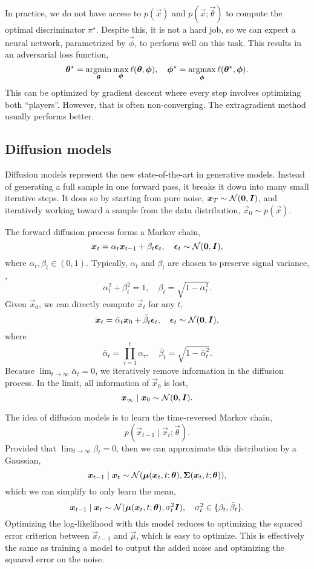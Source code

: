 In practice, we do not have access to $p(\vec{x})$ and $p(\vec{x}; \vec{\theta})$ to compute the
optimal discriminator $\pi^\star$. Despite this, it is not a hard job, so we can expect a neural
network, parametrized by $\vec{\phi}$, to perform well on this task. This results in an adversarial
loss function, \[
    \bm{\theta}^\star = \operatorname*{argmin}_{\bm{\theta}} \max_{\bm{\phi}} \ell(\bm{\theta}, \bm{\phi}), \quad \bm{\phi}^\star = \operatorname*{argmax}_{\bm{\phi}} \ell(\bm{\theta}^\star, \bm{\phi}).
\]
This can be optimized by gradient descent where every step involves optimizing both ``players''.
However, that is often non-converging. The extragradient method usually performs better.

\subsection{Diffusion models}

Diffusion models represent the new state-of-the-art in generative models. Instead of generating a
full sample in one forward pass, it breaks it down into many small iterative steps. It does so by
starting from pure noise, $\bm{x}_T \sim \mathcal{N}(\bm{0}, \bm{I})$, and iteratively working
toward a sample from the data distribution, $\vec{x}_0 \sim p(\vec{x})$.

The forward diffusion process forms a Markov chain, \[
    \bm{x}_t = \alpha_t \bm{x}_{t-1} + \beta_t \bm{\epsilon}_t, \quad \bm{\epsilon}_t \sim \mathcal{N}(\bm{0}, \bm{I}),
\]
where $\alpha_t, \beta_t \in (0,1)$. Typically, $\alpha_t$ and $\beta_t$ are chosen to preserve
signal variance, \ie, \[
    \alpha_t^2 + \beta_t^2 = 1, \quad \beta_t = \sqrt{1 - \alpha_t^2}.
\]
Given $\vec{x}_0$, we can directly compute $\vec{x}_t$ for any $t$, \[
    \bm{x}_t = \bar{\alpha}_t \bm{x}_0 + \bar{\beta}_t \bm{\epsilon}_t, \quad \bm{\epsilon}_t \sim \mathcal{N}(\bm{0}, \bm{I}),
\]
where \[
    \bar{\alpha}_t = \prod_{\tau=1}^{t} \alpha_\tau, \quad \bar{\beta}_t = \sqrt{1 - \bar{\alpha}_t^2}.
\]
Because $\lim_{t \to \infty} \bar{\alpha}_t = 0$, we iteratively remove information in the
diffusion process. In the limit, all information of $\vec{x}_0$ is lost, \[
    \bm{x}_{\infty} \mid \bm{x}_0 \sim \mathcal{N}(\bm{0}, \bm{I}).
\]

The idea of diffusion models is to learn the time-reversed Markov chain, \[
    p(\vec{x}_{t-1} \mid \vec{x}_t; \vec{\theta}).
\]
Provided that $\lim_{t\to \infty} \beta_t = 0$, then we can approximate this distribution by a
Gaussian, \[
    \bm{x}_{t-1} \mid \bm{x}_t \sim \mathcal{N}(\bm{\mu}(\bm{x}_t, t; \bm{\theta}), \bm{\Sigma}(\bm{x}_t, t; \bm{\theta})),
\]
which we can simplify to only learn the mean, \[
    \bm{x}_{t-1} \mid \bm{x}_t \sim \mathcal{N}(\bm{\mu}(\bm{x}_t, t; \bm{\theta}), \sigma_t^2 \bm{I}), \quad \sigma_t^2 \in \{ \beta_t, \bar{\beta}_t \}.
\]
Optimizing the log-likelihood with this model reduces to optimizing the squared error criterion
between $\vec{x}_{t-1}$ and $\vec{\mu}$, which is easy to optimize. This is effectively the same as
training a model to output the added noise and optimizing \wrt the squared error on the noise.

